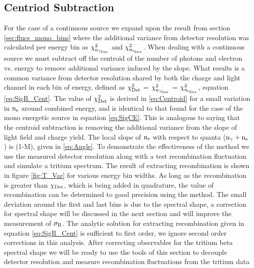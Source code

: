 

\subsection{Centriod Subtraction}
\label{sec:Centroid}
For the case of a continuous source we expand upon the result from section \ref{sec:flucs_mono_bins} where the additional variance from detector resolution was calculated per energy bin as $\rm \chi_{n_{\gamma_{Det}}}^2$ and $\rm \chi_{n_{e_{Det}}}^2$. When dealing with a continuous source we must subtract off the centroid of the number of photons and electron vs. energy to remove additional variance induced by the slope. What results is a common variance from detector resolution shared by both the charge and light channel in each bin of energy, defined as $\rm \chi_{Det}^2$ = $\rm \chi_{n_{\gamma_{Det}}}^2$ = $\rm \chi_{n_{e_{Det}}}^2$, equation \ref{eq:SigR_Cent}. The value of $\rm \chi_{Det}^2$ is derived in \ref{eq:Centroid} for a small variation in $\rm n_e$ around combined energy, and is identical to that found for the case of the mono energetic source in equation \ref{eq:SigCE}. This is analogous to saying that the centroid subtraction is removing the additional variance from the slope of light field and charge yield. The local slope of  $\rm n_e$ with respect to quanta ($\rm n_\gamma + n_e$) is (1-M), given in \ref{eq:Angle}. 
To demonstrate the effectiveness of the method we use the measured detector resolution along with a test recombination fluctuation and simulate a tritium spectrum. The result of extracting recombination is shown in figure \ref{fig:T_Var} for various energy bin widths. As long as the recombination is greater than $\rm \chi_{Det}$, which is being added in quadrature, the value of recombination can be determined to good precision using the method. The small deviation around the first and last bins is due to the spectral shape, a correction for spectral shape will be discussed in the next section and will improve the measurement of $\rm \sigma_R$. The analytic solution for extracting recombination given in equation \ref{eq:SigR_Cent} is sufficient to first order, we ignore second order corrections in this analysis. After correcting observables for the tritium beta spectral shape we will be ready to use the tools of this section to decouple detector resolution and measure recombination fluctuations from the tritium data

